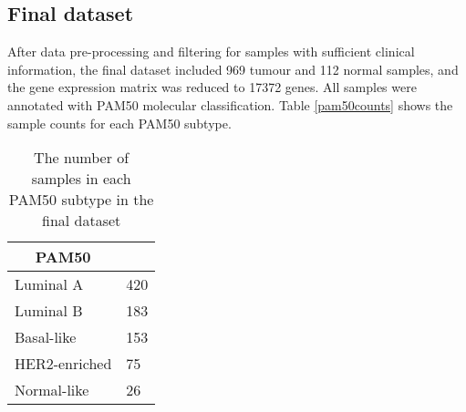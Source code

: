 



    
    
    
    
    \subsection{Final dataset}
    
    After data pre-processing and filtering for samples with sufficient clinical information, the final dataset included 969 tumour and 112 normal samples, and  the gene expression matrix was reduced to 17372 genes. 
    All samples were annotated with PAM50 molecular classification. Table \ref{pam50counts} shows the sample counts for each PAM50 subtype. 
    
    
                \begin{table}[!htbp]
                \centering
                \caption{The number of samples in each PAM50 subtype in the final dataset}
                \label{table:pam50counts}
                \begin{tabular}{ll}
                \multicolumn{1}{c}{\textbf{PAM50}} &  \\ \hline
                \multicolumn{1}{|l|}{Luminal A} & \multicolumn{1}{l|}{420} \\ \hline
                \multicolumn{1}{|l|}{Luminal B} & \multicolumn{1}{l|}{183} \\ \hline
                \multicolumn{1}{|l|}{Basal-like} & \multicolumn{1}{l|}{153} \\ \hline
                \multicolumn{1}{|l|}{HER2-enriched} & \multicolumn{1}{l|}{75} \\ \hline
                \multicolumn{1}{|l|}{Normal-like} & \multicolumn{1}{l|}{26} \\ \hline
                \end{tabular}
                \end{table}
                
